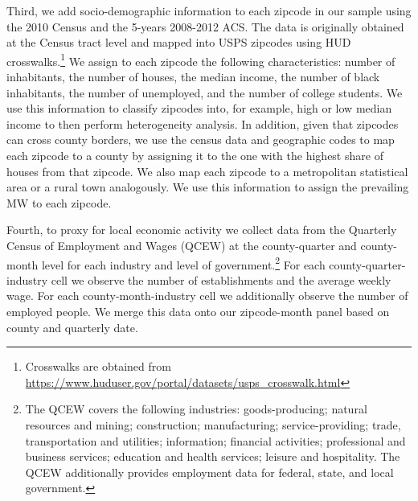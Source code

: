 Third, we add socio-demographic information to each zipcode in our sample using the 2010 Census and 
the 5-years 2008-2012 ACS. The data is originally obtained at the Census tract level and mapped into 
USPS zipcodes using HUD crosswalks.\footnote{Crosswalks are obtained from
	 \url{https://www.huduser.gov/portal/datasets/usps_crosswalk.html}} 
We assign to each zipcode the following characteristics: number of inhabitants, the number of houses, 
the median income, the number of black inhabitants, the number of unemployed, and the number of 
college students. We use this information to classify zipcodes into, for example, high or low median 
income to then perform heterogeneity analysis. In addition, given that zipcodes can cross county 
borders, we use the census data and geographic codes to map each zipcode to a county by assigning it 
to the one with the highest share of houses from that zipcode. We also map each zipcode to a 
metropolitan statistical area or a rural town analogously. We use this information to assign the 
prevailing MW to each zipcode.


Fourth, to proxy for local economic activity we collect data from the Quarterly Census of Employment 
and Wages (QCEW) at the county-quarter and county-month level for each industry and level of 
government.\footnote{The QCEW covers the following industries: goods-producing; natural resources and 
	mining; construction; manufacturing; service-providing; trade, transportation and utilities; 
	information; financial activities; professional and business services; education and health 
	services; leisure and hospitality. The QCEW additionally provides employment data for federal, 
	state, and local government.} 
For each county-quarter-industry cell we observe the number of establishments and the average weekly 
wage. For each county-month-industry cell we additionally observe the number of employed people. We 
merge this data onto our zipcode-month panel based on county and quarterly date.

